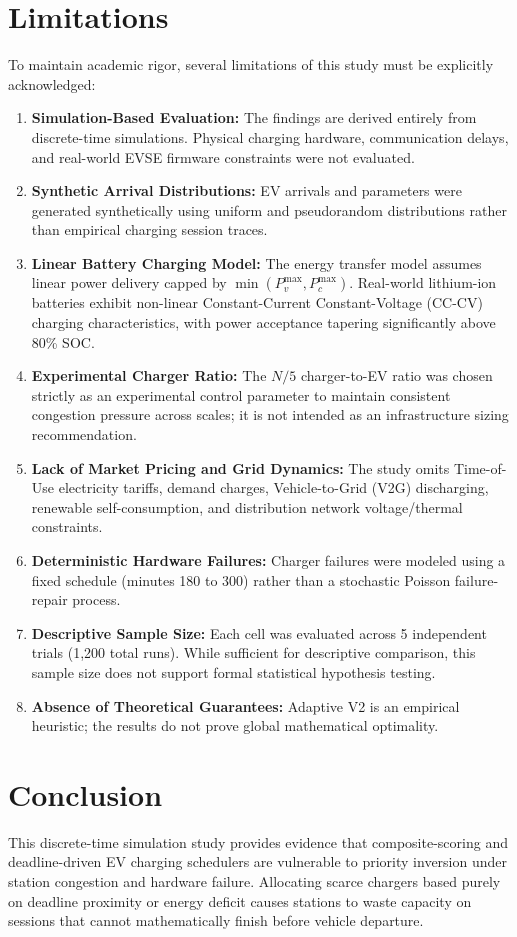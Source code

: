 \documentclass[conference]{IEEEtran}
\begin{document}
\section{Limitations}
\label{sec:limitations}
To maintain academic rigor, several limitations of this study must be explicitly acknowledged:
\begin{enumerate}
    \item \textbf{Simulation-Based Evaluation:} The findings are derived entirely from discrete-time simulations. Physical charging hardware, communication delays, and real-world EVSE firmware constraints were not evaluated.
    \item \textbf{Synthetic Arrival Distributions:} EV arrivals and parameters were generated synthetically using uniform and pseudorandom distributions rather than empirical charging session traces.
    \item \textbf{Linear Battery Charging Model:} The energy transfer model assumes linear power delivery capped by $\min(P_v^{\max}, P_c^{\max})$. Real-world lithium-ion batteries exhibit non-linear Constant-Current Constant-Voltage (CC-CV) charging characteristics, with power acceptance tapering significantly above 80\% SOC.
    \item \textbf{Experimental Charger Ratio:} The $N/5$ charger-to-EV ratio was chosen strictly as an experimental control parameter to maintain consistent congestion pressure across scales; it is not intended as an infrastructure sizing recommendation.
    \item \textbf{Lack of Market Pricing and Grid Dynamics:} The study omits Time-of-Use electricity tariffs, demand charges, Vehicle-to-Grid (V2G) discharging, renewable self-consumption, and distribution network voltage/thermal constraints.
    \item \textbf{Deterministic Hardware Failures:} Charger failures were modeled using a fixed schedule (minutes 180 to 300) rather than a stochastic Poisson failure-repair process.
    \item \textbf{Descriptive Sample Size:} Each cell was evaluated across 5 independent trials (1,200 total runs). While sufficient for descriptive comparison, this sample size does not support formal statistical hypothesis testing.
    \item \textbf{Absence of Theoretical Guarantees:} Adaptive V2 is an empirical heuristic; the results do not prove global mathematical optimality.
\end{enumerate}

\section{Conclusion}
\label{sec:conclusion}
This discrete-time simulation study provides evidence that composite-scoring and deadline-driven EV charging schedulers are vulnerable to priority inversion under station congestion and hardware failure. Allocating scarce chargers based purely on deadline proximity or energy deficit causes stations to waste capacity on sessions that cannot mathematically finish before vehicle departure.
\end{document}
